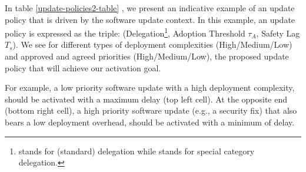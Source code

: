  In table \ref{update-policies2-table} 
, we present an indicative example of an update policy that is driven by the software update context. In this example, an update policy is expressed as the triple: (Delegation\footnote{ stands for (standard) delegation while  stands for special category delegation. }, Adoption Threshold $\tau_A$, Safety Lag $T_s$). We see for different types of deployment complexities (High/Medium/Low) and approved and agreed priorities (High/Medium/Low), the proposed update policy that will achieve our activation goal. 

For example, a low priority software update with a high deployment complexity, should be activated with a maximum delay (top left cell). At the opposite end (bottom right cell), a high priority software update (e.g., a security fix) that also 
bears a low deployment overhead, should be activated with a minimum of delay. 

 


